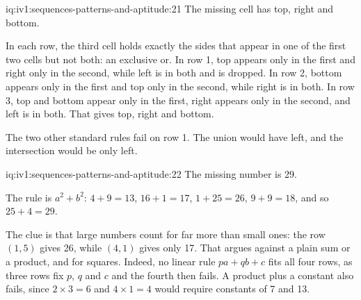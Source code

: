 \begin{solution}{iq:iv1:sequences-patterns-and-aptitude:21}
The missing cell has top, right and bottom.

In each row, the third cell holds exactly the sides that appear in one of the first two cells but not both: an exclusive or. In row 1, top appears only in the first and right only in the second, while left is in both and is dropped. In row 2, bottom appears only in the first and top only in the second, while right is in both. In row 3, top and bottom appear only in the first, right appears only in the second, and left is in both. That gives top, right and bottom.

The two other standard rules fail on row 1. The union would have left, and the intersection would be only left.

\end{solution}

\begin{solution}{iq:iv1:sequences-patterns-and-aptitude:22}
The missing number is 29.

The rule is $a^2 + b^2$: $4 + 9 = 13$, $16 + 1 = 17$, $1 + 25 = 26$, $9 + 9 = 18$, and so $25 + 4 = 29$.

The clue is that large numbers count for far more than small ones: the row $(1, 5)$ gives 26, while $(4, 1)$ gives only 17. That argues against a plain sum or a product, and for squares. Indeed, no linear rule $pa + qb + c$ fits all four rows, as three rows fix $p$, $q$ and $c$ and the fourth then fails. A product plus a constant also fails, since $2 \times 3 = 6$ and $4 \times 1 = 4$ would require constants of 7 and 13.

\end{solution}

